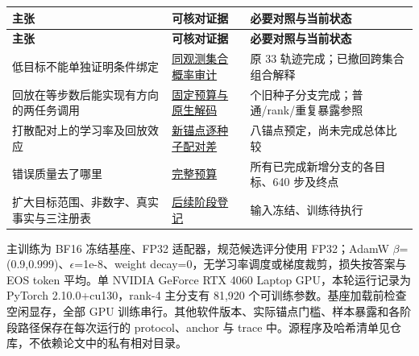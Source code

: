 \documentclass[UTF8,fontset=fandol,10pt,a4paper]{ctexart}
\begin{document}
\begingroup\small\setlength{\tabcolsep}{3pt}\begin{longtable}{@{}>{\raggedright\arraybackslash}p{}>{\raggedright\arraybackslash}p{}>{\raggedright\arraybackslash}p{}@{}}\toprule
\textbf{主张} & \textbf{可核对证据} & \textbf{必要对照与当前状态}\\\midrule\endfirsthead\textbf{主张} & \textbf{可核对证据} & \textbf{必要对照与当前状态}\\\midrule\endhead
低目标不能单独证明条件绑定 & \href{https://github.com/soloduist-pixiv/lora-binding-interference/blob/main/outputs/binding_revision2_20261111/\%E7\%A6\%BB\%E7\%BA\%BF\%E5\%AE\%A1\%E8\%AE\%A1.md}{同观测集合概率审计} & 原 33 轨迹完成；已撤回跨集合组合解释\\
回放在等步数后能实现有方向的两任务调用 & \href{https://github.com/soloduist-pixiv/lora-binding-interference/blob/main/outputs/binding_revision2_20261111/\%E5\%9B\%BA\%E5\%AE\%9A\%E9\%A2\%84\%E7\%AE\%97\%E5\%AF\%B9\%E7\%85\%A7.md}{固定预算与原生解码} & 12 个旧种子分支完成；普通/rank/重复暴露参照\\
打散配对上的学习率及回放效应 & \href{https://github.com/soloduist-pixiv/lora-binding-interference/blob/main/outputs/binding_revision2_20261111/\%E6\%96\%B0\%E9\%94\%9A\%E7\%82\%B9\%E9\%85\%8D\%E5\%AF\%B9\%E5\%B7\%AE.md}{新锚点逐种子配对差} & 八锚点预定，尚未完成总体比较\\
错误质量去了哪里 & \href{https://github.com/soloduist-pixiv/lora-binding-interference/blob/main/outputs/binding_revision2_20261111/\%E5\%AE\%8C\%E6\%95\%B4\%E8\%B4\%A8\%E9\%87\%8F\%E9\%A2\%84\%E7\%AE\%97.md}{完整预算} & 所有已完成新增分支的各目标、640 步及终点\\
扩大目标范围、非数字、真实事实与三注册表 & \href{https://github.com/soloduist-pixiv/lora-binding-interference/blob/main/paper/revision2_protocol.md}{后续阶段登记} & 输入冻结、训练待执行\\
\bottomrule\end{longtable}\endgroup
主训练为 BF16 冻结基座、FP32 适配器，规范候选评分使用 FP32；AdamW \(\beta\)=(0.9,0.999)、\(\epsilon\)=1e-8、weight decay=0，无学习率调度或梯度裁剪，损失按答案与 EOS token 平均。单 NVIDIA GeForce RTX 4060 Laptop GPU，本轮运行记录为 PyTorch 2.10.0+cu130，rank-4 主分支有 81,920 个可训练参数。基座加载前检查空闲显存，全部 GPU 训练串行。其他软件版本、实际锚点门槛、样本暴露和各阶段路径保存在每次运行的 protocol、anchor 与 trace 中。源程序及哈希清单见仓库，不依赖论文中的私有相对目录。
\end{document}
